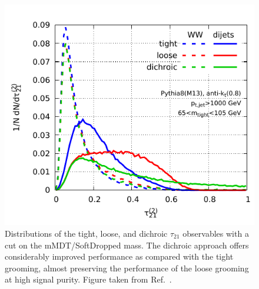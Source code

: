 \documentclass[11pt]{cernrep}
\begin{document}

\begin{figure}[t]
\begin{center}
\includegraphics[width=0.5\columnwidth]{jetsub_2prong_dichroic-illust}
\end{center}
\caption{Distributions of the tight, loose, and dichroic $\tau_{21}$ observables with a cut on the mMDT/SoftDropped mass. The dichroic approach offers considerably improved performance as compared with the tight grooming, almost preserving the performance of the loose grooming at high signal purity.  Figure taken from Ref.~\cite{Salam:2016yht}.}
\label{jetsub_2prong_fig:dichroic_distribution}
\end{figure}

\end{document}
